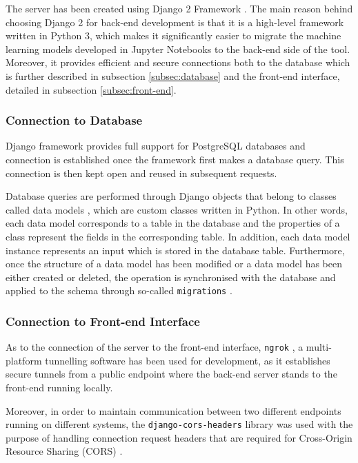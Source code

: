 \documentclass[bsc,frontabs,twoside,singlespacing, parskip,deptreport]{infthesis}     %
\begin{document}
The server has been created using Django 2 Framework \cite{django}. The main reason behind choosing Django 2 for back-end development is that it is a high-level framework written in Python 3, which makes it significantly easier to migrate the machine learning models developed in Jupyter Notebooks to the back-end side of the tool. Moreover, it provides efficient and secure connections both to the database which is further described in subsection \ref{subsec:database} and the front-end interface, detailed in subsection \ref{subsec:front-end}.

\subsubsection*{Connection to Database}

Django framework provides full support for PostgreSQL databases and connection is established once the framework first makes a database query. This connection is then kept open and reused in subsequent requests.

Database queries are performed through Django objects that belong to classes called data models \cite{django-queries}, which are custom classes written in Python. In other words, each data model corresponds to a table in the database and the properties of a class represent the fields in the corresponding table. In addition, each data model instance represents an input which is stored in the database table. Furthermore, once the structure of a data model has been modified or a data model has been either created or deleted, the operation is synchronised with the database and applied to the schema through so-called \texttt{migrations} \cite{django-migrations}.

\subsubsection*{Connection to Front-end Interface}

As to the connection of the server to the front-end interface, \texttt{ngrok} \cite{ngrok}, a multi-platform tunnelling software has been used for development, as it establishes secure tunnels from a public endpoint where the back-end server stands to the front-end running locally. 

Moreover, in order to maintain communication between two different endpoints running on different systems, the \texttt{django-cors-headers} \cite{django-cors} library was used with the purpose of handling connection request headers that are required for Cross-Origin Resource Sharing (CORS) \cite{cors}.
\end{document}
